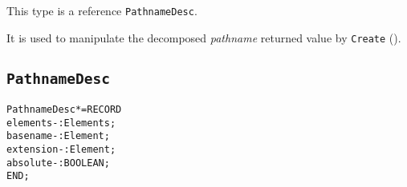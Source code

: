 \begin{semantics}
  This type is a reference \texttt{PathnameDesc}.

It is used to manipulate the decomposed \emph{pathname} returned value
by \texttt{Create} ().
\end{semantics}

\subsection{\texttt{PathnameDesc}}\label{pathnames:pathnamedesc}

\begin{alltt}
  PathnameDesc* = RECORD
    elements-  : Elements;
    basename-  : Element;
    extension- : Element;
    absolute-  : BOOLEAN;
  END;
\end{alltt}

